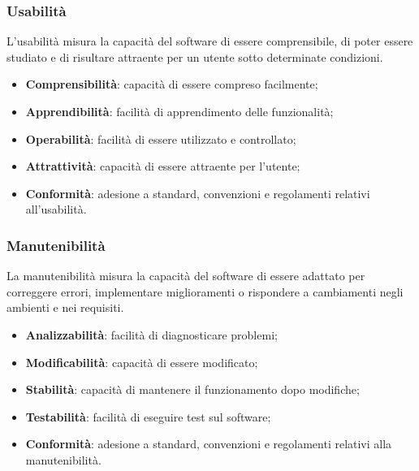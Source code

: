 \subsubsection{Usabilità}
L'usabilità misura la capacità del software di essere comprensibile, di poter essere
studiato e di risultare attraente per un utente sotto determinate condizioni.
\begin{itemize}
    \item \textbf{Comprensibilità}: capacità di essere compreso facilmente;
    \item \textbf{Apprendibilità}: facilità di apprendimento delle funzionalità;
    \item \textbf{Operabilità}: facilità di essere utilizzato e controllato;
    \item \textbf{Attrattività}: capacità di essere attraente per l'utente;
    \item \textbf{Conformità}: adesione a standard, convenzioni e regolamenti relativi all'usabilità.
\end{itemize}

\subsubsection{Manutenibilità}
La manutenibilità misura la capacità del software di essere adattato per 
correggere errori, implementare miglioramenti o rispondere a cambiamenti 
negli ambienti e nei requisiti.

\begin{itemize}
    \item \textbf{Analizzabilità}: facilità di diagnosticare problemi;
    \item \textbf{Modificabilità}: capacità di essere modificato;
    \item \textbf{Stabilità}: capacità di mantenere il funzionamento dopo modifiche;
    \item \textbf{Testabilità}: facilità di eseguire test sul software;
    \item \textbf{Conformità}: adesione a standard, convenzioni e regolamenti relativi alla manutenibilità.
\end{itemize}

